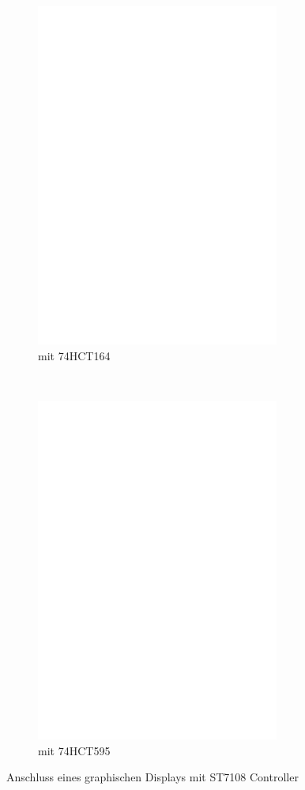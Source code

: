 \begin{figure}[H]
  \begin{subfigure}[b]{9cm}
    \centering
    \includegraphics[width=8cm]{../FIG/ST7108serial164.eps}
    \caption{mit 74HCT164}
  \end{subfigure}
  ~
  \begin{subfigure}[b]{9cm}
    \centering
    \includegraphics[width=8cm]{../FIG/ST7108serial595.eps}
    \caption{mit 74HCT595}
  \end{subfigure}
  \caption{Anschluss eines graphischen Displays mit ST7108 Controller}
  \label{fig:ST7108lcd}
\end{figure}

